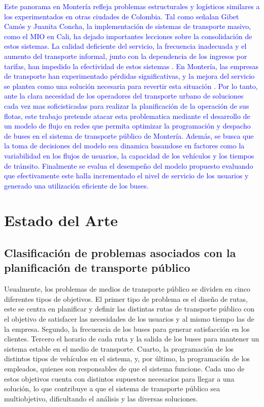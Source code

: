 \documentclass[preprint,11pt]{elsarticle}
\newcommand{\Blue}[1]{\textcolor{blue}{#1}}
\begin{document}
\Blue{Este panorama en Montería refleja problemas estructurales y logísticos similares a los experimentados en otras ciudades de Colombia. Tal como señalan Gibet Camós y Juanita Concha, la implementación de sistemas de transporte masivo, como el MIO en Cali, ha dejado importantes lecciones sobre la consolidación de estos sistemas. La calidad deficiente del servicio, la frecuencia inadecuada y el aumento del transporte informal, junto con la dependencia de los ingresos por tarifas, han impedido la efectividad de estos sistemas \cite{camos2020transporte}. En Montería, las empresas de transporte han experimentado pérdidas significativas, y la mejora del servicio se plantea como una solución necesaria para revertir esta situación \cite{fenalco2023perdidas}. 
Por lo tanto, ante la clara necesidad de los operadores del transporte urbano de soluciones cada vez mas soficisticadas para realizar la planificación de la operación de sus flotas, este trabajo pretende atacar esta problematica mediante el desarrollo de un modelo de flujo en redes que permita optimizar la programación y despacho de buses en el sistema de transporte público de Montería. Además, se busca que la toma de decisiones del modelo sea dinamica basandose en factores como la variabilidad en los flujos de usuarios, la capacidad de los vehículos y los tiempos de tránsito. Finalmente se evalua el desempeño del modelo propuesto evaluando que efectivamente este halla incrementado el nivel de servicio de los usuarios y generado una utilización eficiente de los buses.}
 
\section{Estado del Arte}
\vspace{-1mm}
\label{Int}

\subsection{Clasificación de problemas asociados con la planificación de transporte público}

Usualmente, los problemas de medios de transporte público se dividen en cinco diferentes tipos de objetivos. El primer tipo de problema es el diseño de rutas, este se centra en planificar y definir las distintas rutas de transporte público con el objetivo de satisfacer las necesidades de los usuarios y al mismo tiempo las de la empresa. Segundo, la frecuencia de los buses para generar satisfacción en los clientes. Tercero el horario de cada ruta y la salida de los buses para mantener un sistema estable en el medio de transporte. Cuarto, la programación de los distintos tipos de vehículos en el sistema, y, por último, la programación de los empleados, quienes son responsables de que el sistema funcione. Cada uno de estos objetivos cuenta con distintos supuestos necesarios para llegar a una solución, lo que contribuye a que el sistema de transporte público sea multiobjetivo, dificultando el análisis y las diversas soluciones. \Blue{\cite{guihaire2008}}
\end{document}
